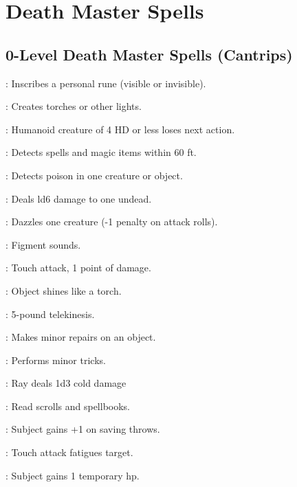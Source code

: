 \section{Death Master Spells}

\begin{multicols}{2}

\subsection{0-Level Death Master Spells (Cantrips)}
\begin{description*}
\item[\linkspell{Arcane Mark}:] Inscribes a personal rune (visible or invisible).
\item[\linkspell{Dancing Lights}:] Creates torches or other lights.
\item[\linkspell{Daze}:] Humanoid creature of 4 HD or less loses next action.
\item[\linkspell{Detect Magic}:] Detects spells and magic items within 60 ft.
\item[\linkspell{Detect Poison}:] Detects poison in one creature or object.
\item[\linkspell{Disrupt Undead}:] Deals ld6 damage to one undead.
\item[\linkspell{Flare}:] Dazzles one creature (-1 penalty on attack rolls).
\item[\linkspell{Ghost Sound}:] Figment sounds.
\item[\linkspell{Inflict Minor Wounds}:] Touch attack, 1 point of damage.
\item[\linkspell{Light}:] Object shines like a torch.
\item[\linkspell{Mage Hand}:] 5-pound telekinesis.
\item[\linkspell{Mending}:] Makes minor repairs on an object.
\item[\linkspell{Prestidigitation}:] Performs minor tricks.
\item[\linkspell{Ray of Frost}:] Ray deals 1d3 cold damage
\item[\linkspell{Read Magic}:] Read scrolls and spellbooks.
\item[\linkspell{Resistance}:] Subject gains +1 on saving throws.
\item[\linkspell{Touch of Fatigue}:] Touch attack fatigues target.
\item[\linkspell{Virtue}:] Subject gains 1 temporary hp.
\end{description*}


\end{multicols}
